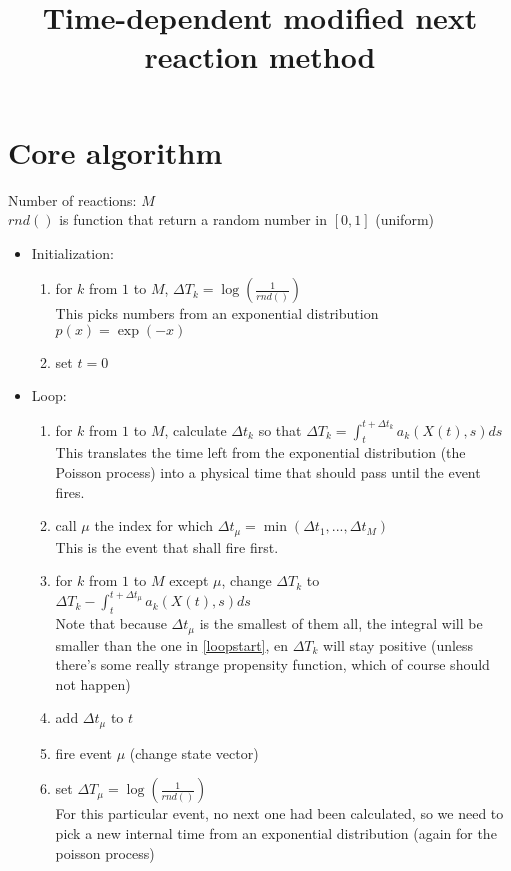 \documentclass[a4paper,11pt]{article}
\begin{document}
	\title{\bf Time-dependent modified next reaction method}
	\maketitle

	\section*{Core algorithm}

		Number of reactions: $M$\\
		$rnd()$ is function that return a random number in $[0,1]$ (uniform)
	
		\begin{itemize}
			\item Initialization: 
			\begin{enumerate}
				\item for $k$ from $1$ to $M$, $\Delta T_k = \log\left(\frac{1}{rnd()}\right)$ \\
					This picks numbers from an exponential distribution $p(x) = \exp(-x)$
				\item set $t = 0$
			\end{enumerate}
			\item Loop:
			\begin{enumerate}
				\item for $k$ from $1$ to $M$, calculate $\Delta t_k$ so that $\Delta T_k = \int_t^{t+\Delta t_k} a_k(X(t),s) ds $ \\
					This translates the time left from the exponential distribution (the Poisson process) into
					a physical time that should pass until the event fires. \label{loopstart}
				\item call $\mu$ the index for which $\Delta t_\mu = \min(\Delta t_1, ... , \Delta t_M)$ \\
					This is the event that shall fire first.
				\item for $k$ from $1$ to $M$ except $\mu$, change $\Delta T_k$ to $\Delta T_k - \int_t^{t+\Delta t_\mu} a_k(X(t),s) ds $ \\
					Note that because $\Delta t_\mu$ is the smallest of them all, the integral will be smaller
					than the one in \ref{loopstart}, en $\Delta T_k$ will stay positive (unless there's some 
					really strange propensity function, which of course should not happen)
				\item add $\Delta t_\mu$ to $t$
				\item fire event $\mu$ (change state vector)
				\item set $\Delta T_\mu = \log\left(\frac{1}{rnd()}\right)$ \\
					For this particular event, no next one had been calculated, so we need to pick
					a new internal time from an exponential distribution (again for the poisson process)
			\end{enumerate}
		\end{itemize}
\end{document}
